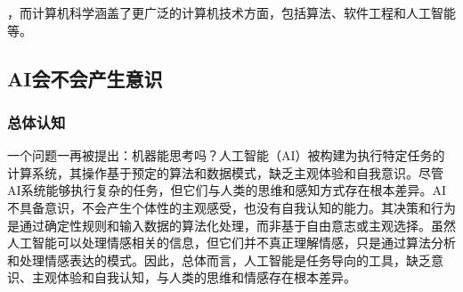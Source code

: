 \documentclass[square]{article}
\begin{document}
，而计算机科学涵盖了更广泛的计算机技术方面，包括算法、软件工程和人工智能等。\par


\subsection{AI会不会产生意识}

\subsubsection{总体认知}
一个问题一再被提出：机器能思考吗？\cite{ref4}人工智能（AI）被构建为执行特定任务的计算系统，其操作基于预定的算法和数据模式，缺乏主观体验和自我意识。尽管AI系统能够执行复杂的任务，但它们与人类的思维和感知方式存在根本差异。AI不具备意识，不会产生个体性的主观感受，也没有自我认知的能力。其决策和行为是通过确定性规则和输入数据的算法化处理，而非基于自由意志或主观选择。虽然人工智能可以处理情感相关的信息，但它们并不真正理解情感，只是通过算法分析和处理情感表达的模式。因此，总体而言，人工智能是任务导向的工具，缺乏意识、主观体验和自我认知，与人类的思维和情感存在根本差异。\par
\end{document}
